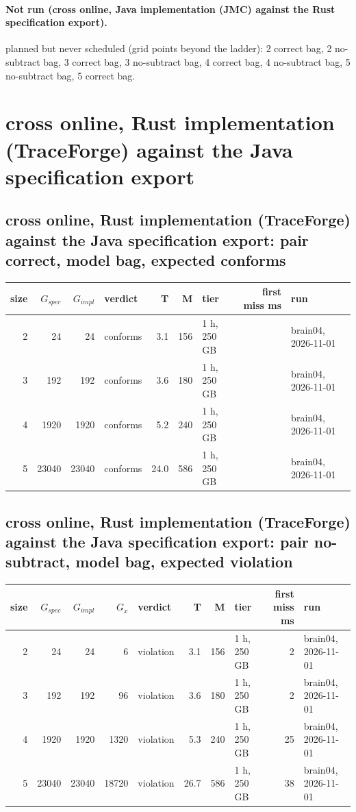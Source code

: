 \documentclass[10pt]{article}
\begin{document}
\paragraph{Not run (cross online, Java implementation (JMC) against the Rust specification export).}
planned but never scheduled (grid points beyond the ladder): 2 correct bag, 2 no-subtract bag, 3 correct bag, 3 no-subtract bag, 4 correct bag, 4 no-subtract bag, 5 no-subtract bag, 5 correct bag.\par
\section*{cross online, Rust implementation (TraceForge) against the Java specification export}
\subsection*{cross online, Rust implementation (TraceForge) against the Java specification export: pair \textsf{correct}, model bag, expected conforms}
\begin{longtable}{@{}rrrlrrlrl@{}}
\toprule
size & $G_{\mathit{spec}}$ & $G_{\mathit{impl}}$ & verdict & T & M & tier & first miss ms & run \\
\midrule
\endhead
\color{red} 2 & 24 & 24 & conforms & 3.1 & 156 & 1 h, 250 GB &  & brain04, 2026-11-01 \\
\color{red} 3 & 192 & 192 & conforms & 3.6 & 180 & 1 h, 250 GB &  & brain04, 2026-11-01 \\
\color{red} 4 & 1920 & 1920 & conforms & 5.2 & 240 & 1 h, 250 GB &  & brain04, 2026-11-01 \\
\color{red} 5 & 23040 & 23040 & conforms & 24.0 & 586 & 1 h, 250 GB &  & brain04, 2026-11-01 \\
\bottomrule
\end{longtable}
\subsection*{cross online, Rust implementation (TraceForge) against the Java specification export: pair \textsf{no-subtract}, model bag, expected violation}
\begin{longtable}{@{}rrrrlrrlrl@{}}
\toprule
size & $G_{\mathit{spec}}$ & $G_{\mathit{impl}}$ & $G_x$ & verdict & T & M & tier & first miss ms & run \\
\midrule
\endhead
\color{red} 2 & 24 & 24 & 6 & violation & 3.1 & 156 & 1 h, 250 GB & 2 & brain04, 2026-11-01 \\
\color{red} 3 & 192 & 192 & 96 & violation & 3.6 & 180 & 1 h, 250 GB & 2 & brain04, 2026-11-01 \\
\color{red} 4 & 1920 & 1920 & 1320 & violation & 5.3 & 240 & 1 h, 250 GB & 25 & brain04, 2026-11-01 \\
\color{red} 5 & 23040 & 23040 & 18720 & violation & 26.7 & 586 & 1 h, 250 GB & 38 & brain04, 2026-11-01 \\
\bottomrule
\end{longtable}
\end{document}
